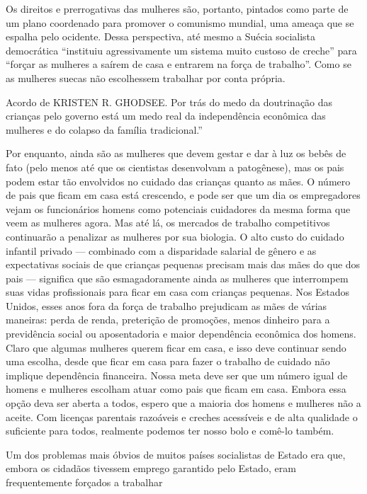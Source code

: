  \par 
Os direitos e prerrogativas das mulheres são, portanto, pintados como parte de um plano coordenado para promover o comunismo mundial, uma ameaça que se espalha pelo ocidente. Dessa perspectiva, até mesmo a Suécia socialista democrática “instituiu agressivamente um sistema muito custoso de creche” para “forçar as mulheres a saírem de casa e entrarem na força de trabalho”. Como se as mulheres suecas não escolhessem trabalhar por conta própria.
 \par 
Acordo de KRISTEN R. GHODSEE. Por trás do medo da doutrinação das crianças pelo governo está um medo real da independência econômica das mulheres e do colapso da família tradicional.”
 \par 
Por enquanto, ainda são as mulheres que devem gestar e dar à luz os bebês de fato (pelo menos até que os cientistas desenvolvam a patogênese), mas os pais podem estar tão envolvidos no cuidado das crianças quanto as mães. O número de pais que ficam em casa está crescendo, e pode ser que um dia os empregadores vejam os funcionários homens como potenciais cuidadores da mesma forma que veem as mulheres agora. Mas até lá, os mercados de trabalho competitivos continuarão a penalizar as mulheres por sua biologia. O alto custo do cuidado infantil privado — combinado com a disparidade salarial de gênero e as expectativas sociais de que crianças pequenas precisam mais das mães do que dos pais — significa que são esmagadoramente ainda as mulheres que interrompem suas vidas profissionais para ficar em casa com crianças pequenas. Nos Estados Unidos, esses anos fora da força de trabalho prejudicam as mães de várias maneiras: perda de renda, preterição de promoções, menos dinheiro para a previdência social ou aposentadoria e maior dependência econômica dos homens. Claro que algumas mulheres querem ficar em casa, e isso deve continuar sendo uma escolha, desde que ficar em casa para fazer o trabalho de cuidado não implique dependência financeira. Nossa meta deve ser que um número igual de homens e mulheres escolham atuar como pais que ficam em casa. Embora essa opção deva ser aberta a todos, espero que a maioria dos homens e mulheres não a aceite. Com licenças parentais razoáveis ​​e creches acessíveis e de alta qualidade o suficiente para todos, realmente podemos ter nosso bolo e comê-lo também.
 \par 
Um dos problemas mais óbvios de muitos países socialistas de Estado era que, embora os cidadãos tivessem emprego garantido pelo Estado, eram frequentemente forçados a trabalhar
